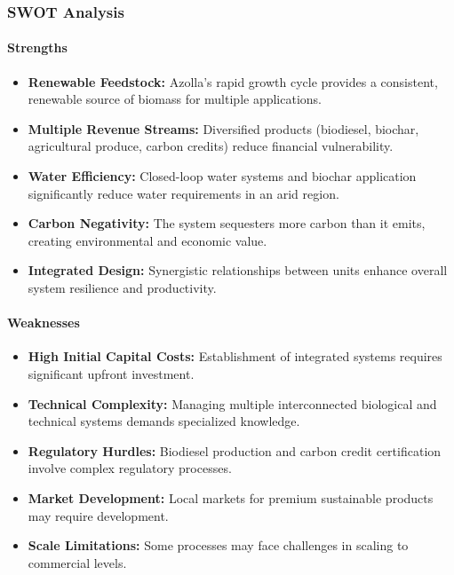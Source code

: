 \subsubsection{SWOT Analysis}

\paragraph{Strengths}
\begin{itemize}
    \item \textbf{Renewable Feedstock:} Azolla's rapid growth cycle provides a consistent, renewable source of biomass for multiple applications.
    \item \textbf{Multiple Revenue Streams:} Diversified products (biodiesel, biochar, agricultural produce, carbon credits) reduce financial vulnerability.
    \item \textbf{Water Efficiency:} Closed-loop water systems and biochar application significantly reduce water requirements in an arid region.
    \item \textbf{Carbon Negativity:} The system sequesters more carbon than it emits, creating environmental and economic value.
    \item \textbf{Integrated Design:} Synergistic relationships between units enhance overall system resilience and productivity.
\end{itemize}

\paragraph{Weaknesses}
\begin{itemize}
    \item \textbf{High Initial Capital Costs:} Establishment of integrated systems requires significant upfront investment.
    \item \textbf{Technical Complexity:} Managing multiple interconnected biological and technical systems demands specialized knowledge.
    \item \textbf{Regulatory Hurdles:} Biodiesel production and carbon credit certification involve complex regulatory processes.
    \item \textbf{Market Development:} Local markets for premium sustainable products may require development.
    \item \textbf{Scale Limitations:} Some processes may face challenges in scaling to commercial levels.
\end{itemize}

